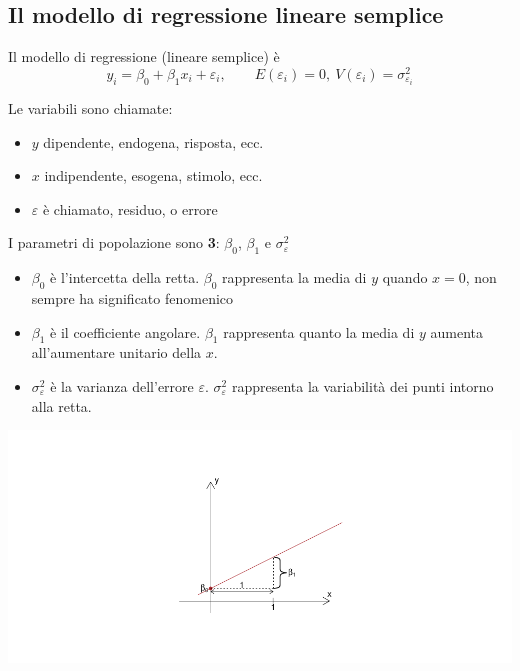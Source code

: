 \documentclass[
  11pt,
]{book}
\providecommand{\tightlist}{%
  \setlength{\itemsep}{0pt}\setlength{\parskip}{0pt}}
\theoremstyle{mytheoremstyle}
\theoremstyle{mydefstyle}
\newenvironment{nota}
  {
\begin{tcolorbox}[enhanced,breakable,arc=0.1mm,boxrule=1pt,colback=white,colframe=iblue,title=\bf \fontfamily{lmss}\selectfont \faInfoCircle \hspace{.5 cm} Nota,drop fuzzy shadow]
}{
\end{tcolorbox}
  }
\begin{document}
\subsection{Il modello di regressione lineare semplice}\label{il-modello-di-regressione-lineare-semplice}

Il modello di regressione (lineare semplice) è
\[
y_i=\beta_0+\beta_1x_i+\varepsilon_i,\qquad E(\varepsilon_i)=0,~V(\varepsilon_i)=\sigma^2_{\varepsilon_i}
\]

\begin{nota}

Le variabili sono chiamate:

\begin{itemize}
\tightlist
\item
  \(y\) dipendente, endogena, risposta, ecc.
\item
  \(x\) indipendente, esogena, stimolo, ecc.
\item
  \(\varepsilon\) è chiamato, residuo, o errore
\end{itemize}

I parametri di popolazione sono \textbf{3}: \(\beta_0\), \(\beta_1\) e \(\sigma^2_\varepsilon\)

\begin{itemize}
\tightlist
\item
  \(\beta_0\) è l'intercetta della retta. \(\beta_0\) rappresenta la media di \(y\) quando \(x=0\), non sempre ha significato fenomenico
\item
  \(\beta_1\) è il coefficiente angolare. \(\beta_1\) rappresenta quanto la media di \(y\) aumenta all'aumentare unitario della \(x\).
\item
  \(\sigma^2_\varepsilon\) è la varianza dell'errore \(\varepsilon\). \(\sigma^2_\varepsilon\) rappresenta la variabilità dei punti intorno alla retta.
\end{itemize}

\begin{center}\includegraphics{Appunti_di_Statistica_2025_files/figure-latex/17-regressione-I-17-1} \end{center}

\end{nota}
\end{document}
